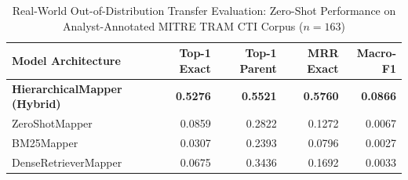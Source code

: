 \begin{table}[t]
\centering
\caption{Real-World Out-of-Distribution Transfer Evaluation: Zero-Shot Performance on Analyst-Annotated MITRE TRAM CTI Corpus ($n=163$)}
\label{tab:external_transfer}
\begin{tabular}{lrrrr}
\toprule
Model Architecture & Top-1 Exact & Top-1 Parent & MRR Exact & Macro-F1 \\ \midrule
\textbf{HierarchicalMapper (Hybrid)} & \textbf{0.5276} & \textbf{0.5521} & \textbf{0.5760} & \textbf{0.0866} \\
ZeroShotMapper & 0.0859 & 0.2822 & 0.1272 & 0.0067 \\
BM25Mapper & 0.0307 & 0.2393 & 0.0796 & 0.0027 \\
DenseRetrieverMapper & 0.0675 & 0.3436 & 0.1692 & 0.0033 \\
\bottomrule
\end{tabular}
\end{table}